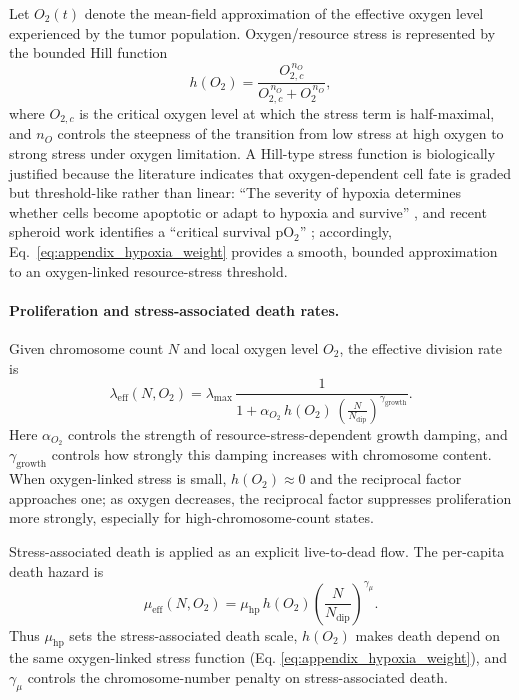 \documentclass[11pt]{article}
\begin{document}
Let $O_2(t)$ denote the mean-field approximation of the effective oxygen level experienced by the tumor population. Oxygen/resource stress is represented by the bounded Hill function
\begin{equation} 
h(O_2)=\frac{O_{2,c}^{\,n_O}}{O_{2,c}^{\,n_O}+O_2^{\,n_O}},
\label{eq:appendix_hypoxia_weight}
\end{equation}
where $O_{2,c}$ is the critical oxygen level at which the stress term is half-maximal, and $n_O$ controls the steepness of the transition from low stress at high oxygen to strong stress under oxygen limitation. A Hill-type stress function is biologically justified because the literature indicates that oxygen-dependent cell fate is graded but threshold-like rather than linear: ``The severity of hypoxia determines whether cells become apoptotic or adapt to hypoxia and survive'' \cite{greijer_role_2004}, and recent spheroid work identifies a ``critical survival pO$_2$'' \cite{shang_novel_2024}; accordingly, Eq.~\eqref{eq:appendix_hypoxia_weight} provides a smooth, bounded approximation to an oxygen-linked resource-stress threshold.

\paragraph{Proliferation and stress-associated death rates.}

Given chromosome count $N$ and local oxygen level $O_2$, the effective division rate is
\begin{equation}
\lambda_{\mathrm{eff}}(N,O_2)
=
\lambda_{\max}\,
\frac{1}{1+\alpha_{O_2}\,h(O_2)\,
\left(\frac{N}{N_{\mathrm{dip}}}\right)^{\gamma_{\mathrm{growth}}}}.
\label{eq:appendix_lambda_eff_soft}
\end{equation}
Here $\alpha_{O_2}$ controls the strength of resource-stress-dependent growth damping, and $\gamma_{\mathrm{growth}}$ controls how strongly this damping increases with chromosome content. When oxygen-linked stress is small, $h(O_2)\approx 0$ and the reciprocal factor approaches one; as oxygen decreases, the reciprocal factor suppresses proliferation more strongly, especially for high-chromosome-count states.

Stress-associated death is applied as an explicit live-to-dead flow. The per-capita death hazard is
\begin{equation}
\mu_{\mathrm{eff}}(N,O_2)
=
\mu_{\mathrm{hp}}\,
h(O_2)
\left(\frac{N}{N_{\mathrm{dip}}}\right)^{\gamma_\mu}.
\label{eq:appendix_mu_soft}
\end{equation}
Thus $\mu_{\mathrm{hp}}$ sets the stress-associated death scale, $h(O_2)$ makes death depend on the same oxygen-linked stress function (Eq. \eqref{eq:appendix_hypoxia_weight}), and $\gamma_\mu$ controls the chromosome-number penalty on stress-associated death.
\end{document}
